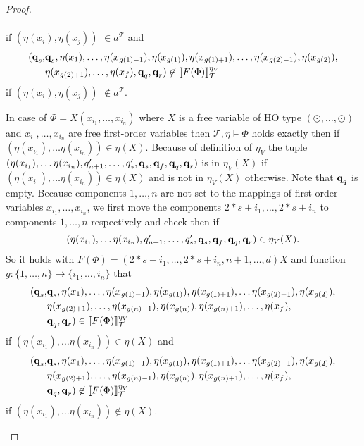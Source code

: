 \begin{proof}
\begin{compactitem}
\begin{align*}
        \end{align*}
        if $(\eta(x_i), \eta(x_j))$ $ \in a^\mathcal{T}$ and
        \begin{align*}
            (\emph{q}_s, &\emph{q}_s, \eta(x_1), \dots, \eta(x_{g(1) - 1}), \eta(x_{g(1)}), \eta(x_{g(1)+1}), \dots, \eta(x_{g(2)-1}), \eta
            (x_{g(2)}),\\& \eta(x_{g(2)+1}), \dots, \eta(x_f), \emph{q}_q, \emph{q}_r) \not\in \llbracket F(\Phi) \rrbracket^{\eta_V}_\mathcal{T}
        \end{align*}
        if $(\eta(x_i), \eta(x_j))$ $ \not\in a^\mathcal{T}$.

        \item In case of $\Phi = X(x_{i_1}, \dots, x_{i_n})$ where $X$ is a free variable of HO type $(\odot, \dots,
        \odot)$ and $x_{i_1}, \dots, x_{i_n}$ are free first-order variables then $\mathcal{T}, \eta \models \Phi$
        holds exactly then if $(\eta(x_{i_1}), \dots \eta(x_{i_n})) \in \eta(X)$. Because of definition of $\eta_V$ the
        tuple $(\eta(x_{i_1}), \dots \eta(x_{i_n}), q_{n + 1}', \dots, q_{s}', \emph{q}_s, \emph{q}_f, \emph{q}_q, \emph{q}_r)$ is in $
        \eta_V(X)$ if $(\eta(x_{i_1}),\dots \eta(x_{i_n})) \in \eta(X)$ and is not in $\eta_V(X)$ otherwise. Note that $\emph{q}_q$ is empty. Because
         components $1, \dots, n$ are not set to the mappings of first-order variables $x_{i_1}, \dots, x_{i_n}$, we first move the components $2*s+i_1, \dots, 2*s+i_n$ to components $1, \dots, n$ respectively and check then if
        \[(\eta(x_{i_1}), \dots \eta(x_{i_n}), q_{n + 1}', \dots, q_{s}', \emph{q}_s, \emph{q}_f, \emph{q}_q, \emph{q}_r) \in \eta_V(X).\]
        So it holds with $F(\Phi) = {(2*s+i_1, \dots, 2*s+i_n, n+1, \dots, d)}X$ and function $g: \{1, \dots, n\}
        \rightarrow \{i_1, \dots, i_n\}$ that
        \begin{align*}
            (\emph{q}_s, &\emph{q}_s, \eta(x_1), \dots, \eta(x_{g(1)-1}), \eta(x_{g(1)}), \eta(x_{g(1)+1}), \dots \eta(x_{g(2)-1}), \eta
            (x_{g(2)}),\\& \eta(x_{g(2)+1}), \dots, \eta(x_{g(n)-1}), \eta(x_{g(n)}), \eta(x_{g(n)+1}), \dots, \eta
            (x_f),\\& \emph{q}_q, \emph{q}_r) \in \llbracket F(\Phi) \rrbracket^{\eta_V
            }_\mathcal{T}
        \end{align*}
        if $(\eta(x_{i_1}), \dots \eta(x_{i_n})) \in \eta(X)$ and
        \begin{align*}
            (\emph{q}_s, &\emph{q}_s, \eta(x_1), \dots, \eta(x_{g(1)-1}), \eta(x_{g(1)}), \eta(x_{g(1)+1}), \dots \eta(x_{g(2)-1}), \eta
            (x_{g(2)}),\\& \eta(x_{g(2)+1}), \dots, \eta(x_{g(n)-1}), \eta(x_{g(n)}), \eta(x_{g(n)+1}), \dots, \eta
            (x_f),\\& \emph{q}_q, \emph{q}_r) \not\in \llbracket F(\Phi) \rrbracket^{\eta_V
            }_\mathcal{T}
        \end{align*}
        if $(\eta(x_{i_1}), \dots \eta(x_{i_n})) \not\in \eta(X)$.


\end{compactitem}
\end{proof}
